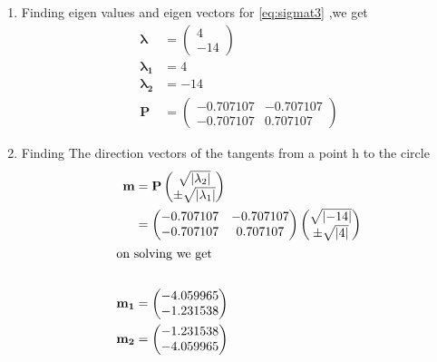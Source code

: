 \documentclass[11pt, a4paper]{article}
\newcommand{\myvec}[1]{\ensuremath{\begin{pmatrix}#1\end{pmatrix}}}
\let\vec\mathbf
\newcommand{\abs}[1]{\left| #1 \right|}
\providecommand{\abs}[1]{\left\vert#1\right\vert}
\begin{document}
\begin{enumerate}
\begin{enumerate}
\item  Finding eigen values and eigen vectors for \eqref{eq:sigmat3} ,we get 
	\begin{align}
		\vec{\lambda} &=\myvec{4\\-14} \\
		\vec{\lambda_1} &=4 \\
		\vec{\lambda_2} &=-14  \\
		\vec{P} &=\myvec{ -0.707107& -0.707107\\ -0.707107 & 0.707107} 
	\end{align}

\item Finding  The direction vectors of the tangents from a point h to the circle
\begin{align}
	\vec{m} &=\vec{P}\myvec{\sqrt{\abs{\lambda_2}}\\ \pm \sqrt{\abs{\lambda_1}}} \\
		&=\myvec{ -0.707107& -0.707107\\ -0.707107 & 0.707107}\myvec{\sqrt{\abs{-14}}\\ \pm \sqrt{\abs{4}}} \\
\intertext{on solving  we get  }   \nonumber \\ 
	\vec{m_1} &=\myvec{-4.059965 \\ -1.231538 } \\
	\vec{m_2} &=\myvec{-1.231538 \\ -4.059965 } 
\end{align}


\end{enumerate}
\end{enumerate}
\end{document}
